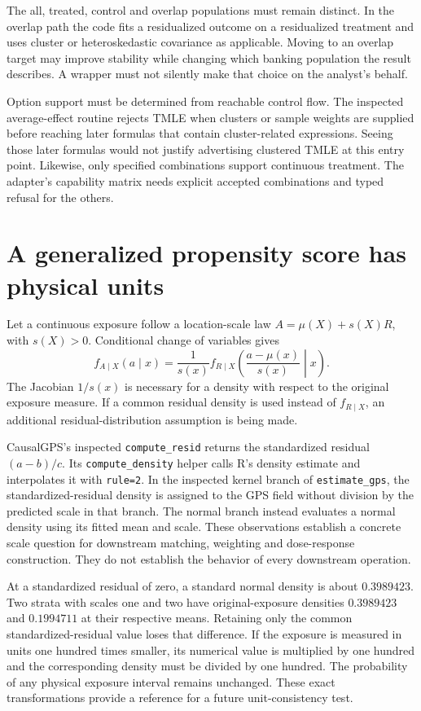 The all, treated, control and overlap populations must remain distinct. In the
overlap path the code fits a residualized outcome on a residualized treatment
and uses cluster or heteroskedastic covariance as applicable. Moving to an
overlap target may improve stability while changing which banking population
the result describes. A wrapper must not silently make that choice on the
analyst's behalf.\cite{v131_sw_grf}

Option support must be determined from reachable control flow. The inspected
average-effect routine rejects TMLE when clusters or sample weights are supplied
before reaching later formulas that contain cluster-related expressions. Seeing
those later formulas would not justify advertising clustered TMLE at this entry
point. Likewise, only specified combinations support continuous treatment.
The adapter's capability matrix needs explicit accepted combinations and
typed refusal for the others.\cite{v131_sw_grf}

\section{A generalized propensity score has physical units}

Let a continuous exposure follow a location-scale law
$A=\mu(X)+s(X)R$, with $s(X)>0$. Conditional change of variables gives
\[
 f_{A\mid X}(a\mid x)
 =\frac{1}{s(x)}f_{R\mid X}
       \left(\frac{a-\mu(x)}{s(x)}\middle|x\right).
\]
The Jacobian $1/s(x)$ is necessary for a density with respect to the original
exposure measure. If a common residual density is used instead of
$f_{R\mid X}$, an additional residual-distribution assumption is being made.

CausalGPS's inspected \texttt{compute\_resid} returns the standardized residual
$(a-b)/c$. Its \texttt{compute\_density} helper calls R's density estimate and
interpolates it with \texttt{rule=2}. In the inspected kernel branch of
\texttt{estimate\_gps}, the standardized-residual density is assigned to the
GPS field without division by the predicted scale in that branch. The normal
branch instead evaluates a normal density using its fitted mean and scale.
These observations establish a concrete scale question for downstream matching,
weighting and dose-response construction. They do not establish the behavior
of every downstream operation.\cite{v13_sw_causalgps,v131_sw_causalgps}

At a standardized residual of zero, a standard normal density is about
$0.3989423$. Two strata with scales one and two have original-exposure densities
$0.3989423$ and $0.1994711$ at their respective means. Retaining only the common
standardized-residual value loses that difference. If the exposure is measured
in units one hundred times smaller, its numerical value is multiplied by one
hundred and the corresponding density must be divided by one hundred. The
probability of any physical exposure interval remains unchanged. These exact
transformations provide a reference for a future unit-consistency test.
\cite{v131_project_semantics}

